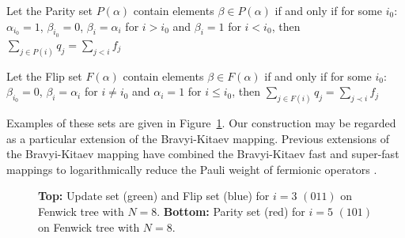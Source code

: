 \begin{definition} Let the Parity set $P(\alpha)$ contain elements $\beta \in P(\alpha)$ if and only if for some $i_0$: $\alpha_{i_0} = 1$, $\beta_{i_0} = 0$, $\beta_i = \alpha_i$ for $i> i_0$ and $\beta_i = 1$ for $i< i_0$, then $
        \sum_{j \in P(i)} q_j = \sum_{j < i} f_j$
\end{definition}

\begin{definition} Let the Flip set $F(\alpha)$ contain elements $\beta \in F(\alpha)$ if and only if for some $i_0$: $\beta_{i_0} = 0$, $\beta_i = \alpha_i$ for $i\neq i_0$ and $\alpha_i = 1$ for $i\leq i_0$, then $
 \sum_{j \in F(i)} q_j = \sum_{j \prec i} f_j$
\end{definition}

Examples of these sets are given in Figure~\ref{fenwick_trees}.  Our construction may be regarded as a particular extension of the Bravyi-Kitaev mapping. Previous extensions of the Bravyi-Kitaev mapping have combined the Bravyi-Kitaev fast and super-fast mappings to logarithmically reduce the Pauli weight of fermionic operators \cite{Setia_2019}.
\begin{figure}[htbp]
  \centering
{}
\caption{\label{fenwick_trees} \textbf{Top:}  Update set (green) and Flip set (blue) for $i=3$ $(011)$ on Fenwick tree with $N=8$. \textbf{Bottom:} Parity set (red) for $i=5$ $(101)$ on Fenwick tree with $N=8$.}
\end{figure} \noindent

